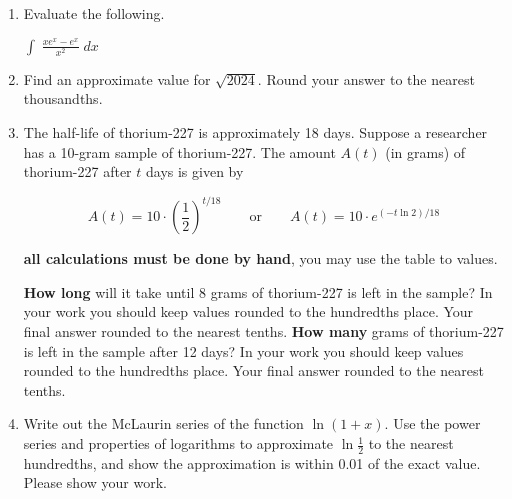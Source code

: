 \documentclass[10pt,letterpaper]{article}
\begin{document}
\begin{enumerate}

\item Evaluate the following.

$\displaystyle \int \; \frac{x e^x - e^x}{x^2} \; dx$
\item Find an approximate value for $\displaystyle \sqrt{2024}$.  Round your answer to the nearest thousandths. 
 
\item The half-life of thorium-227 is approximately 18 days.  Suppose a researcher has a 10-gram sample of thorium-227.  The amount $A(t)$ (in grams) of thorium-227 after $t$ days is given by 

$$A(t)=10 \cdot \left( \frac{1}{2} \right)^{t/18}  \qquad \text{or} \qquad A(t)=10 \cdot e^{(-t \ln2)/18}$$

 {\bf all calculations must be done by hand}, you may use the table to values.

\textbf{How long} will it take until 8 grams of thorium-227 is left in the sample?  In your work you should keep values rounded to the hundredths place.  Your final answer rounded to the nearest tenths.  \textbf{How many} grams of thorium-227 is left in the sample after 12 days?   In your work you should keep values rounded to the hundredths place.  Your final answer rounded to the nearest tenths.

\item  Write out the McLaurin series of the function $\displaystyle  \ln(1+x)$.  Use the power series and properties of logarithms to approximate $\displaystyle \ln \frac{1}{2}$ to the nearest hundredths, and show the approximation is within 0.01 of the exact value.  Please show your work.

\end{enumerate}
\end{document}
